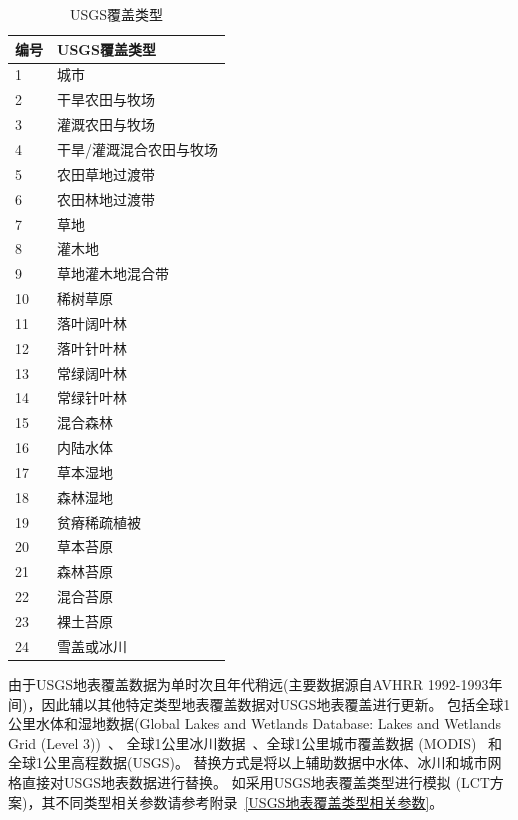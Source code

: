 \begin{table}[htbp]
  \centering
  \caption{USGS覆盖类型}
  \label{tab:USGS覆盖类型}
  \begin{tabular}{@{}ll@{}}
    \toprule
    编号 & USGS覆盖类型            \\ \midrule
    1    & 城市                    \\
    2    & 干旱农田与牧场          \\
    3    & 灌溉农田与牧场          \\
    4    & 干旱/灌溉混合农田与牧场 \\
    5    & 农田草地过渡带          \\
    6    & 农田林地过渡带          \\
    7    & 草地                    \\
    8    & 灌木地                  \\
    9    & 草地灌木地混合带        \\
    10   & 稀树草原                \\
    11   & 落叶阔叶林              \\
    12   & 落叶针叶林              \\
    13   & 常绿阔叶林              \\
    14   & 常绿针叶林              \\
    15   & 混合森林                \\
    16   & 内陆水体                \\
    17   & 草本湿地                \\
    18   & 森林湿地                \\
    19   & 贫瘠稀疏植被            \\
    20   & 草本苔原                \\
    21   & 森林苔原                \\
    22   & 混合苔原                \\
    23   & 裸土苔原                \\
    24   & 雪盖或冰川              \\ \bottomrule
  \end{tabular}
\end{table}


由于USGS地表覆盖数据为单时次且年代稍远(主要数据源自AVHRR 1992-1993年间)，因此辅以其他特定类型地表覆盖数据对USGS地表覆盖进行更新。
包括全球1公里水体和湿地数据(Global Lakes and Wetlands Database: Lakes and Wetlands Grid (Level 3))~\citep{lehner2004development}、
全球1公里冰川数据~\citep{RGIConsortium2017}、全球1公里城市覆盖数据 (MODIS)~\citep{schneider2009new} 和全球1公里高程数据(USGS)。
替换方式是将以上辅助数据中水体、冰川和城市网格直接对USGS地表数据进行替换。
如采用USGS地表覆盖类型进行模拟 (LCT方案)，其不同类型相关参数请参考附录~\ref{USGS地表覆盖类型相关参数}。

